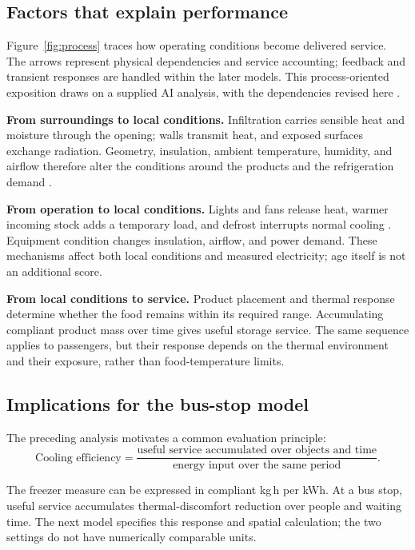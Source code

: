 \documentclass[12pt]{article}
\begin{document}
\clearpage
\subsection{Factors that explain performance}

Figure~\ref{fig:process} traces how operating conditions become delivered service. The arrows represent physical dependencies and service accounting; feedback and transient responses are handled within the later models. This process-oriented exposition draws on a supplied AI analysis, with the dependencies revised here \cite{gemini}.

\noindent\textbf{From surroundings to local conditions.} Infiltration carries sensible heat and moisture through the opening; walls transmit heat, and exposed surfaces exchange radiation. Geometry, insulation, ambient temperature, humidity, and airflow therefore alter the conditions around the products and the refrigeration demand \cite{ashrae}.

\noindent\textbf{From operation to local conditions.} Lights and fans release heat, warmer incoming stock adds a temporary load, and defrost interrupts normal cooling \cite{ashrae}. Equipment condition changes insulation, airflow, and power demand. These mechanisms affect both local conditions and measured electricity; age itself is not an additional score.

\noindent\textbf{From local conditions to service.} Product placement and thermal response determine whether the food remains within its required range. Accumulating compliant product mass over time gives useful storage service. The same sequence applies to passengers, but their response depends on the thermal environment and their exposure, rather than food-temperature limits.

\subsection{Implications for the bus-stop model}

The preceding analysis motivates a common evaluation principle:
\begin{equation}
\boxed{\text{Cooling efficiency}
=\frac{\text{useful service accumulated over objects and time}}
{\text{energy input over the same period}}.}
\label{eq:principle}
\end{equation}

The freezer measure can be expressed in compliant kg\,h per kWh. At a bus stop, useful service accumulates thermal-discomfort reduction over people and waiting time. The next model specifies this response and spatial calculation; the two settings do not have numerically comparable units.
\end{document}
